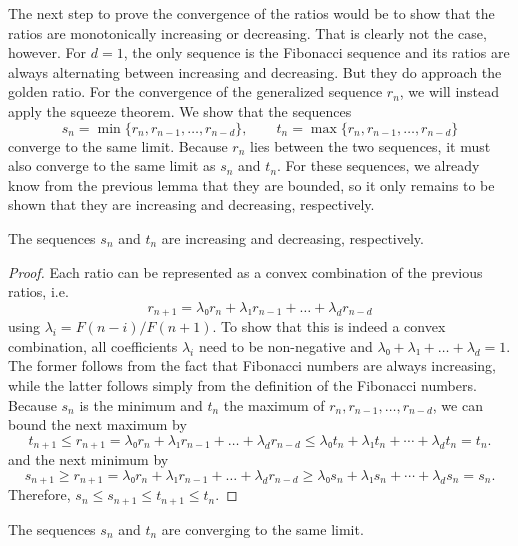 The next step to prove the convergence of the ratios would be to show that the
ratios are monotonically increasing or decreasing.
That is clearly not the case, however.
For $d=1$, the only sequence is the Fibonacci sequence and its ratios are
always alternating between increasing and decreasing.
But they do approach the golden ratio.
For the convergence of the generalized sequence $r_n$,
we will instead apply the squeeze theorem.
We show that the sequences
\[
  s_n = \min\{r_n, r_{n-1}, …, r_{n-d} \}, \qquad t_n = \max\{r_n, r_{n-1}, …, r_{n-d}\}
\]
converge to the same limit.
Because $r_n$ lies between the two sequences, it must also converge to the same limit as $s_n$ and $t_n$.
For these sequences, we already know from the previous lemma that they are bounded,
so it only remains to be shown that they are increasing and decreasing,
respectively.

\begin{lemma}
  The sequences $s_n$ and $t_n$ are increasing and decreasing, respectively.
\end{lemma}

\begin{proof}
  Each ratio can be represented as a convex combination of the previous ratios, i.e.
  \[
    r_{n+1} = λ₀ r_n + λ₁ r_{n-1} + \dots + λ_d r_{n-d}
  \]
  using $λ_i = F(n - i) / F(n + 1)$.
  To show that this is indeed a convex combination, all coefficients $λ_i$
  need to be non-negative and $λ₀ + λ₁ + \dots + \lambda_d = 1$.
  The former follows from the fact that Fibonacci numbers are always increasing,
  while the latter follows simply from the definition of the Fibonacci numbers.
  Because $s_n$ is the minimum and $t_n$ the maximum of $r_n, r_{n-1}, …, r_{n-d}$,
  we can bound the next maximum by
  \[
    t_{n+1} ≤ r_{n+1} = λ₀ r_n + λ₁ r_{n-1} + \dots + λ_d r_{n-d} ≤ λ₀ t_n + λ₁ t_n + ⋯ + λ_d t_n = t_n.
  \]
  and the next minimum by
  \[
    s_{n+1} ≥ r_{n+1} = λ₀ r_n + λ₁ r_{n-1} + \dots + λ_d r_{n-d} ≥ λ₀ s_n + λ₁ s_n + ⋯ + λ_d s_n = s_n.
  \]
  Therefore, $s_n ≤ s_{n+1} ≤ t_{n+1} ≤ t_n$.
\end{proof}

\begin{lemma}
  The sequences $s_n$ and $t_n$ are converging to the same limit.
\end{lemma}

